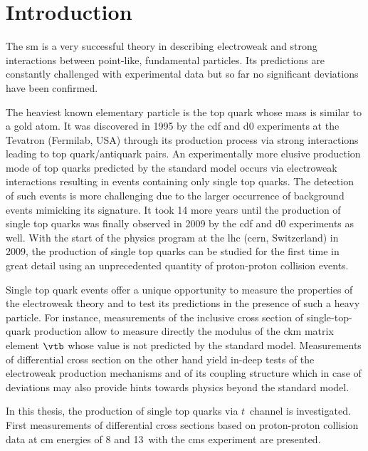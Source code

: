 \chapter*{Introduction}

The \acrlong{sm} is a very successful theory in describing electroweak and strong interactions between point-like, fundamental particles. Its predictions are constantly challenged with experimental data but so far no significant deviations have been confirmed. 

The heaviest known elementary particle is the top quark whose mass is similar to a gold atom. It was discovered in 1995 by the \gls{cdf} and \gls{d0} experiments at the Tevatron (Fermilab, USA) through its production process via strong interactions leading to top quark/antiquark pairs. An experimentally more elusive production mode of top quarks predicted by the standard model occurs via electroweak interactions resulting in events containing only single top quarks. The detection of such events is more challenging due to the larger occurrence of background events mimicking its signature. It took 14 more years until the production of single top quarks was finally observed in 2009 by the \gls{cdf} and \gls{d0} experiments as well. With the start of the physics program at the \gls{lhc} (\gls{cern}, Switzerland) in 2009, the production of single top quarks can be studied for the first time in great detail using an unprecedented quantity of proton-proton collision events.

Single top quark events offer a unique opportunity to measure the properties of the electroweak theory and to test its predictions in the presence of such a heavy particle. For instance, measurements of the inclusive cross section of single-top-quark production allow to measure directly the modulus of the \gls{ckm} matrix element $\vtb$ whose value is not predicted by the standard model. Measurements of differential cross section on the other hand yield in-deep tests of the electroweak production mechanisms and of its coupling structure which in case of deviations may also provide hints towards physics beyond the standard model.

In this thesis, the production of single top quarks via $t$~channel is investigated.  First measurements of differential cross sections based on proton-proton collision data at \acrlong{cm} energies of 8 and 13~\TeV with the \gls{cms} experiment are presented. 

